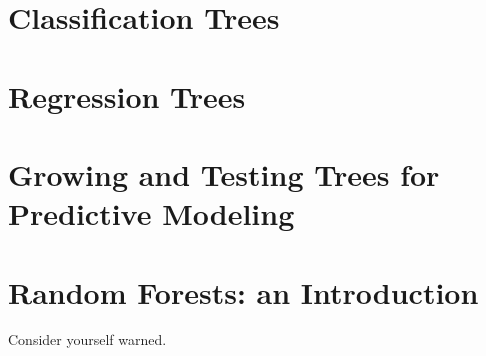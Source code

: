 \documentclass[]{book}
\begin{document}
\chapter{Classification Trees}\label{classification-trees}

\chapter{Regression Trees}\label{regression-trees}

\chapter{Growing and Testing Trees for Predictive
Modeling}\label{growing-and-testing-trees-for-predictive-modeling}

\chapter{Random Forests: an Introduction}\label{randomforests}

\begin{rmdwarning}
Consider yourself warned.
\end{rmdwarning}


\end{document}
